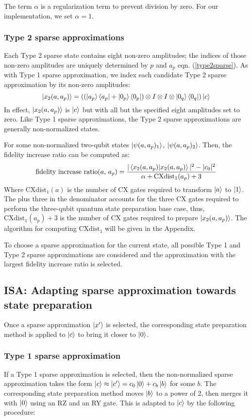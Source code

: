 \documentclass{article}
\begin{document}
The term $\alpha$ is a regularization term to prevent division by zero. For our
implementation, we set $\alpha = 1$.

\subsubsection{Type 2 sparse approximations}
Each Type 2 sparse state contains eight non-zero amplitudes; the indices of
those non-zero amplitudes are uniquely determined by $p$ and $a_p$ eqn. (\ref{type2sparse}). 
As with Type 1 sparse approximation, we index each candidate 
Type 2 sparse approximation by its non-zero amplitudes:
$$\mathinner{|{x_2(a, a_p)}\rangle} = ((\mathinner{|{a_p}\rangle}\mathinner{\langle{a_p}|} + \mathinner{|{0_p}\rangle}\mathinner{\langle{0_p}|}) \otimes I \otimes I \otimes \mathinner{|{0_q}\rangle}\mathinner{\langle{0_q}|})\mathinner{|{c}\rangle}$$
In effect, $\mathinner{|{x_2(a, a_p)}\rangle}$ is $\mathinner{|{c}\rangle}$ but with all but the specified eight
amplitudes set to zero. Like Type 1 sparse approximations, the Type 2 sparse
approximations are generally non-normalized states.

For some non-normalized two-qubit states $\mathinner{|{\psi(a, a_p)_1}\rangle}$, 
$\mathinner{|{\psi(a, a_p)_2}\rangle}$. Then, the fidelity increase ratio can be computed as:
$$\text{fidelity increase ratio($a$, $a_p$)} = \frac{|\mathinner{\langle{x_2(a, a_p) | x_2(a, a_p)}\rangle}|^2 - |c_0|^2}{\alpha + \text{CXdist}_1(a_p) + 3}$$
Where $\text{CXdist}_1(a)$ is the number of CX gates required to transform
$\mathinner{|{a}\rangle}$ to $\mathinner{|{1}\rangle}$. The plus three in the denominator accounts for the 
three CX gates required to perform the three-qubit quantum state preparation
base case, thus, $\text{CXdist}_1(a_p) + 3$ is the number of CX gates required
to prepare $\mathinner{|{x_2(a, a_p)}\rangle}$. The algorithm for computing $\text{CXdist}_1$
will be given in the Appendix.

To choose a sparse approximation for the current state, all possible Type 1 and
Type 2 sparse approximations are considered and the approximation with the
largest fidelity increase ratio is selected.

\subsection{ISA: Adapting sparse approximation towards state preparation}
Once a sparse approximation $\mathinner{|{x'}\rangle}$ is selected, the corresponding state 
preparation method is applied to $\mathinner{|{c}\rangle}$ to bring it closer to $\mathinner{|{0}\rangle}$.
\subsubsection{Type 1 sparse approximation}
If a Type 1 sparse approximation is selected, then the non-normalized sparse 
approximation takes the form
$\mathinner{|{c}\rangle} \approx \mathinner{|{c'}\rangle} = c_0\mathinner{|{0}\rangle} + c_b\mathinner{|{b}\rangle}$
for some $b$. The corresponding state preparation method moves $\mathinner{|{b}\rangle}$ to a 
power of 2, then merges it with $\mathinner{|{0}\rangle}$ using an RZ and an RY
gate. This is adapted to $\mathinner{|{c}\rangle}$ by the following procedure:
\end{document}

